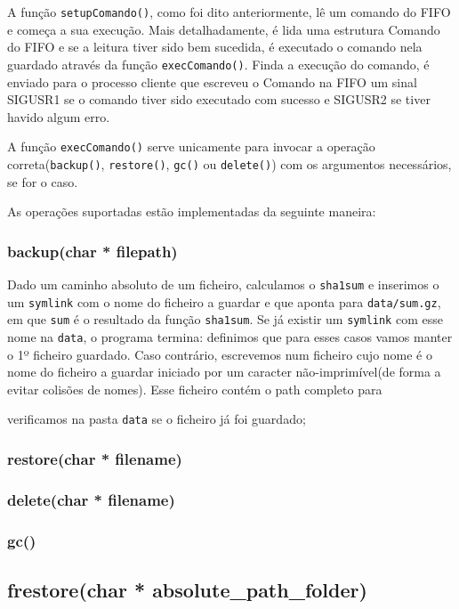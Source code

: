 A função \texttt{setupComando()}, como foi dito anteriormente, lê um comando do FIFO e começa a sua execução. Mais detalhadamente, é lida uma estrutura 
Comando do FIFO e se a leitura tiver sido bem sucedida, é executado o comando nela guardado através da função \texttt{execComando()}. Finda a execução do comando,
é enviado para o processo cliente que escreveu o Comando na FIFO um sinal SIGUSR1 se o comando tiver sido executado com sucesso e SIGUSR2 se tiver havido algum
erro.

A função \texttt{execComando()} serve unicamente para invocar a operação correta(\texttt{backup()}, \texttt{restore()}, \texttt{gc()} ou \texttt{delete()})
com os argumentos necessários, se for o caso.

As operações suportadas estão implementadas da seguinte maneira:
\subsubsection{backup(char * filepath)}
Dado um caminho absoluto de um ficheiro, calculamos o \texttt{sha1sum} e inserimos o um \texttt{symlink} com o nome do ficheiro a guardar e que aponta
para \texttt{data/sum.gz}, em que \texttt{sum} é o resultado da função \texttt{sha1sum}. Se já existir um \texttt{symlink} com esse nome na \texttt{data},
o programa termina: definimos que para esses casos vamos manter o 1º ficheiro guardado. Caso contrário, escrevemos num ficheiro cujo nome é o nome do ficheiro a 
guardar iniciado por um caracter não-imprimível(de forma a evitar colisões de nomes). Esse ficheiro contém o path completo para 

 verificamos na pasta \texttt{data} se o ficheiro já foi guardado;

\subsubsection{restore(char * filename)}

\subsubsection{delete(char * filename)}

\subsubsection{gc()}

\subsection{frestore(char * absolute_path_folder)}

